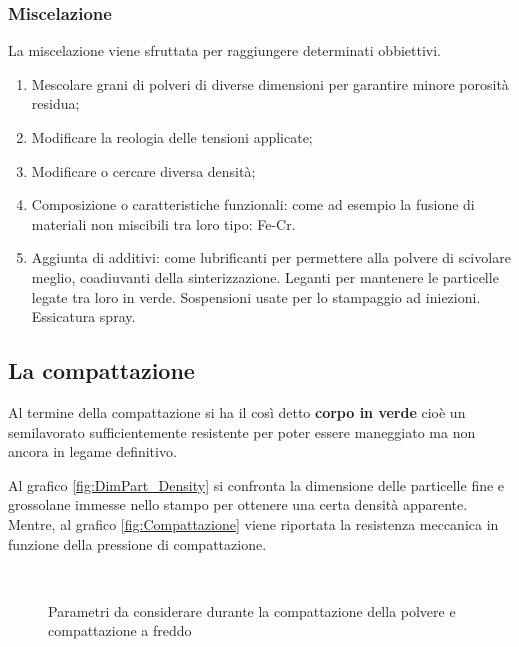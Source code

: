 \subsubsection{Miscelazione}
La miscelazione viene sfruttata per raggiungere determinati obbiettivi.
\begin{enumerate}
\item Mescolare grani di polveri di diverse dimensioni per garantire minore porosità residua;
\item Modificare la reologia delle tensioni applicate;
\item Modificare o cercare diversa densità;
\item Composizione o caratteristiche funzionali: come ad esempio la fusione di materiali non miscibili tra loro tipo: Fe-Cr.
\item Aggiunta di additivi: come lubrificanti per permettere alla polvere di scivolare meglio,
coadiuvanti della sinterizzazione. Leganti per mantenere le particelle legate tra loro in verde. Sospensioni usate per lo stampaggio ad iniezioni. Essicatura spray.
\end{enumerate}

\subsection{La compattazione}
Al termine della compattazione si ha il così detto \textbf{corpo in verde} cioè un semilavorato sufficientemente resistente per poter essere maneggiato ma non ancora in legame definitivo. 

Al grafico \ref{fig:DimPart_Density} si confronta la dimensione delle particelle fine e grossolane immesse nello stampo per ottenere una certa densità apparente.
Mentre, al grafico \ref{fig:Compattazione} viene riportata la resistenza meccanica in funzione della pressione di compattazione.

\begin{figure}
\centering
{}\quad
{}\\
\quad
{}
\caption{Parametri da considerare durante la compattazione della polvere e compattazione a freddo}
\label{fig:ParamCompattazione}
\end{figure}

